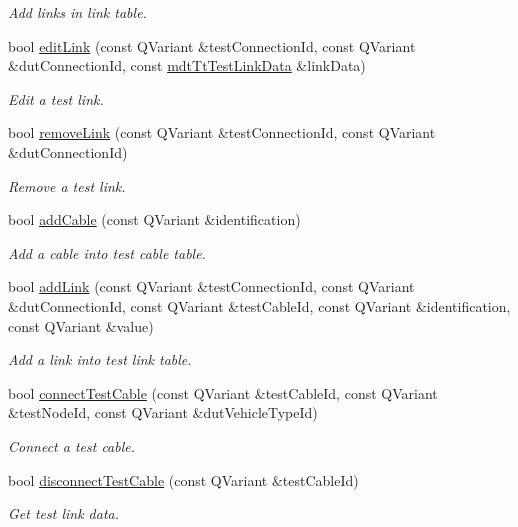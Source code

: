 \begin{DoxyCompactItemize}
\begin{DoxyCompactList}\small\item\em Add links in link table. \end{DoxyCompactList}\item 
bool \hyperlink{classmdt_tt_logical_test_cable_ad786c86aa5b62a7f9537f0b4e4cab05c}{edit\-Link} (const Q\-Variant \&test\-Connection\-Id, const Q\-Variant \&dut\-Connection\-Id, const \hyperlink{classmdt_tt_test_link_data}{mdt\-Tt\-Test\-Link\-Data} \&link\-Data)
\begin{DoxyCompactList}\small\item\em Edit a test link. \end{DoxyCompactList}\item 
bool \hyperlink{classmdt_tt_logical_test_cable_af7cacf5b2cd8d919403f9b28a7c691d3}{remove\-Link} (const Q\-Variant \&test\-Connection\-Id, const Q\-Variant \&dut\-Connection\-Id)
\begin{DoxyCompactList}\small\item\em Remove a test link. \end{DoxyCompactList}\item 
bool \hyperlink{classmdt_tt_logical_test_cable_a17a8fd670453954e44b5718a0afcb2ba}{add\-Cable} (const Q\-Variant \&identification)
\begin{DoxyCompactList}\small\item\em Add a cable into test cable table. \end{DoxyCompactList}\item 
bool \hyperlink{classmdt_tt_logical_test_cable_a5abe6257d4ca126550b9ca9fb31a1ebc}{add\-Link} (const Q\-Variant \&test\-Connection\-Id, const Q\-Variant \&dut\-Connection\-Id, const Q\-Variant \&test\-Cable\-Id, const Q\-Variant \&identification, const Q\-Variant \&value)
\begin{DoxyCompactList}\small\item\em Add a link into test link table. \end{DoxyCompactList}\item 
bool \hyperlink{classmdt_tt_logical_test_cable_a87091b9c88f65fde6029b53c14afd92c}{connect\-Test\-Cable} (const Q\-Variant \&test\-Cable\-Id, const Q\-Variant \&test\-Node\-Id, const Q\-Variant \&dut\-Vehicle\-Type\-Id)
\begin{DoxyCompactList}\small\item\em Connect a test cable. \end{DoxyCompactList}\item 
bool \hyperlink{classmdt_tt_logical_test_cable_a6f26ebeb60eea2f0b0773d7b65ea90dc}{disconnect\-Test\-Cable} (const Q\-Variant \&test\-Cable\-Id)
\begin{DoxyCompactList}\small\item\em Get test link data. \end{DoxyCompactList}\end{DoxyCompactItemize}

